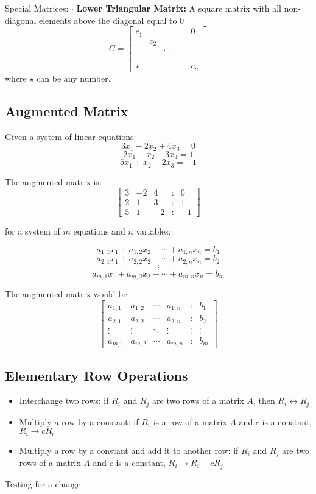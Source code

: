 \documentclass{article}
\begin{document}
\begin{paragraph}{Special Matrices:}
    $\cdot$ \textbf{Lower Triangular Matrix:} A square matrix with all non-diagonal elements above the diagonal equal to 0
        $$ C = \begin{bmatrix}
            c_1 &&&&& 0 \\
            &c_2&&&&\\
            &&.&&&\\
            &&&.&&\\
            &&&&.&\\
            \star&&&&&c_n
        \end{bmatrix}$$
        where $\star$ can be any number.
\end{paragraph}

\subsection*{Augmented Matrix}
Given a system of linear equations:
    $$
    3x_1 - 2x_2 + 4x_3 = 0
    $$
    $$
    2x_1 + x_2 + 3x_3 = 1
    $$
    $$
    5x_1 + x_2 - 2x_3 = -1
    $$
    
The augmented matrix is:
$$
\begin{bmatrix}
    3 & -2 & 4 & : & 0 \\
    2 & 1 & 3 & : & 1 \\
    5 & 1 & -2 & : & -1 
\end{bmatrix}
$$    

for a system of $m$ equations and $n$ variables:

    $$
    a_{1,1} x_1 + a_{1,2} x_2 + \cdots + a_{1,n} x_n = b_1
    $$
    $$
    a_{2,1} x_1 + a_{2,2} x_2 + \cdots + a_{2,n} x_n = b_2
    $$
    $$
    \vdots
    $$
    $$
    a_{m,1} x_1 + a_{m,2} x_2 + \cdots + a_{m,n} x_n = b_m
    $$

The augmented matrix would be:
$$
\begin{bmatrix}
    a_{1,1} & a_{1,2} & \cdots & a_{1,n} & : & b_1 \\
    a_{2,1} & a_{2,2} & \cdots & a_{2,n} & : & b_2 \\
    \vdots & \vdots & \ddots & \vdots & \vdots & \vdots \\
    a_{m,1} & a_{m,2} & \cdots & a_{m,n} & : & b_m
\end{bmatrix}
$$

\subsection*{Elementary Row Operations}
\begin{itemize}
    \item Interchange two rows: if $R_i$ and $R_j$ are two rows of a matrix $A$, then $R_i \leftrightarrow R_j$ 
    \item Multiply a row by a constant: if $R_i$ is a row of a matrix $A$ and $c$ is a constant, $R_i \rightarrow cR_i$
    \item Multiply a row by a constant and add it to another row: if $R_i$ and $R_j$ are two rows of a matrix $A$ and $c$ is a constant, $R_i \rightarrow R_i + cR_j$
\end{itemize}

Testing for a change
\end{document}
